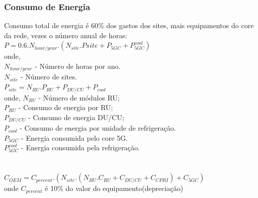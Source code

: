 \documentclass[t]{beamer}
\begin{document}
{ %
 \begin{frame}
\frametitle{Consumo de Energia} 	
  Consumo total de energia é 60\% dos gastos dos sites, mais equipamentos do core da rede, vezes o número anual de horas:\\
  \footnotesize
 $P=0.6 . N_{hour/year} . (N_{site}.P{site}+P_{5GC}+P_{5GC}^{cool})$\\
 onde,\\
  $N_{hour/year} $ - Número de horas por ano.\\
  $ N_{site}$ - Número de sites.\\
  $P_{site}=N_{RU}.P_{RU}+P_{DU/CU}+P_{cool}$\\
onde, $N_{RU}$ - Número de módulos RU;\\
  \hspace{1cm}$P_{RU}$ - Consumo de energia por RU;\\
  \hspace{1cm}$P_{DU/CU}$ - Consumo de energia DU/CU;\\
  \hspace{1cm}$P_{cool}$ - Consumo de energia por unidade de refrigeração.\\
  $P_{5GC}$ - Energia consumida pelo core 5G.\\
 $P_{5GC}^{cool}$ - Energia consumida pela refrigeração.\\
 \\~\\
  $C_{OEM}=C_{percent}.(N_{site}.(N_{RU}.C_{RU}+C_{DU/CU}+C_{CPRI})+C_{5GC})$\\
 onde $C_{percent}$ é 10\% do valor do equipamento(depreciação)\\
 \end{frame}


}
\end{document}
